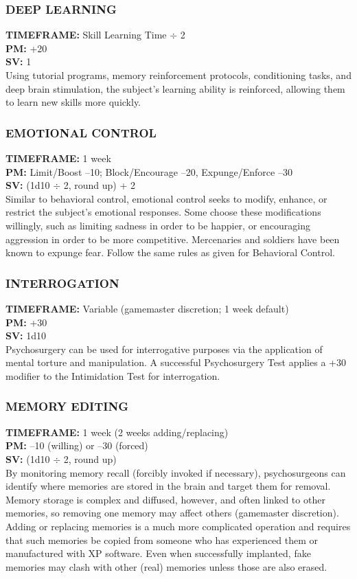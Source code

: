 \subsubsection{DEEP LEARNING}
\textbf{TIMEFRAME:} Skill Learning Time $\div$ 2 \\
\textbf{PM:} +20 \\
\textbf{SV:} 1 \\
Using tutorial programs, memory reinforcement protocols,
conditioning tasks, and deep brain stimulation,
the subject’s learning ability is reinforced, allowing
them to learn new skills more quickly.

\subsubsection{EMOTIONAL CONTROL}
\textbf{TIMEFRAME:} 1 week \\
\textbf{PM:} Limit/Boost –10; Block/Encourage –20, Expunge/Enforce –30 \\
\textbf{SV:} (1d10 $\div$ 2, round up) + 2 \\
Similar to behavioral control, emotional control seeks
to modify, enhance, or restrict the subject’s emotional
responses. Some choose these modifications willingly,
such as limiting sadness in order to be happier, or
encouraging aggression in order to be more competitive.
Mercenaries and soldiers have been known
to expunge fear. Follow the same rules as given for
Behavioral Control.


\subsubsection{INTERROGATION}
\textbf{TIMEFRAME:} Variable (gamemaster discretion; 1 week default) \\
\textbf{PM:} +30 \\
\textbf{SV:} 1d10 \\
Psychosurgery can be used for interrogative purposes
via the application of mental torture and manipulation.
A successful Psychosurgery Test applies a +30
modifier to the Intimidation Test for interrogation.

\subsubsection{MEMORY EDITING}
\textbf{TIMEFRAME:} 1 week (2 weeks adding/replacing) \\
\textbf{PM:} –10 (willing) or –30 (forced) \\
\textbf{SV:} (1d10 $\div$ 2, round up) \\
By monitoring memory recall (forcibly invoked if necessary),
psychosurgeons can identify where memories
are stored in the brain and target them for removal.
Memory storage is complex and diffused, however,
and often linked to other memories, so removing one
memory may affect others (gamemaster discretion).
Adding or replacing memories is a much more complicated
operation and requires that such memories be
copied from someone who has experienced them or
manufactured with XP software. Even when successfully
implanted, fake memories may clash with other
(real) memories unless those are also erased.

